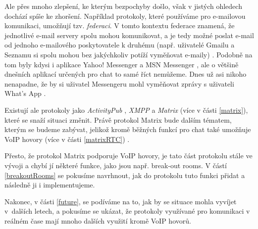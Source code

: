 Ale přes mnoho zlepšení, ke kterým bezpochyby došlo, však v jistých ohledech
dochází spíše ke zhoršení. Například protokoly, které používáme pro e-mailovou
komunikaci, umožňují tzv. \textit{federaci}. V tomto kontextu federace znamená,
že jednotlivé e-mail servery spolu mohou komunikovat, a je tedy možné poslat
e-mail od jednoho e-mailového poskytovatele k druhému (např. uživatelé Gmailu a
Seznamu si spolu mohou bez jakýchkoliv potíží vyměňovat e-maily)
\cite{MatrixORG-FAQ}. Podobně na tom byly kdysi i aplikace Yahoo! Messenger a
MSN Messenger \cite{BetaNews-MSYahooToLinkIMNets}, ale o většině dnešních
aplikací určených pro chat to samé říct nemůžeme. Dnes už asi nikoho nenapadne,
že by si uživatel Messengeru mohl vyměňovat zprávy s uživateli What's App
\cite{9To5Mac-InteroperabilityNightmareAndDream}.

Existují ale protokoly jako \textit{ActivityPub} \cite{W3ORG-ActivityPub},
\textit{XMPP} \cite{XMPPORG-Homepage} a \textit{Matrix}
\cite{MatrixORG-Homepage} (více v části \ref{matrix}), které se snaží situaci
změnit. Právě protokol Matrix bude dalším tématem, kterým se budeme zabývat,
jelikož kromě běžných funkcí pro chat také umožňuje VoIP hovory (více v části
\ref{matrixRTC}) \cite{MatrixORG-Homepage}.

Přesto, že protokol Matrix podporuje VoIP hovory, je tato část protokolu stále
ve vývoji \cite{GitHub-MSC3401,GitHub-MSC3898} a chybí jí některé funkce, jako
jsou např. break-out rooms. V částí \ref{breakoutRooms} se pokusíme navrhnout,
jak do protokolu tuto funkci přidat a následně ji i implementujeme.

Nakonec, v části \ref{future}, se podíváme na to, jak by se situace mohla
vyvíjet v~dalších letech, a pokusíme se ukázat, že protokoly využívané pro
komunikaci v reálném čase mají mnoho dalších využití kromě VoIP hovorů.
